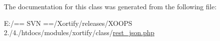 The documentation for this class was generated from the following file\-:\begin{DoxyCompactItemize}
\item 
E\-:/== S\-V\-N ==/\-Xortify/releases/\-X\-O\-O\-P\-S 2./4./htdocs/modules/xortify/class/\hyperlink{rest__json_8php}{rest\-\_\-json.\-php}\end{DoxyCompactItemize}

